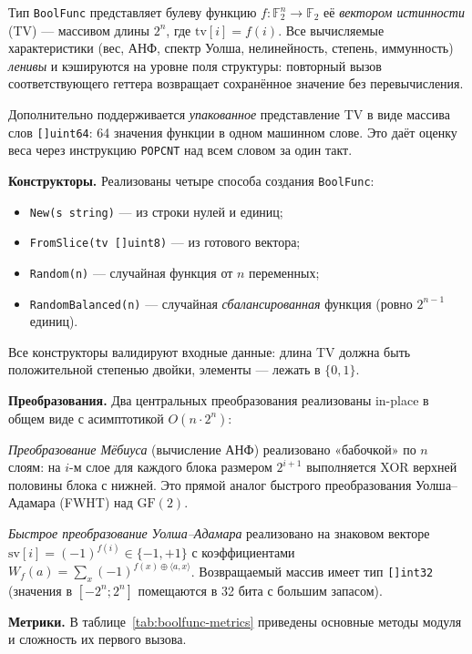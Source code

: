 Тип \texttt{BoolFunc} представляет булеву функцию $f: \mathbb{F}_2^n \to \mathbb{F}_2$
её \emph{вектором истинности} (TV) — массивом длины $2^n$, где
$\mathrm{tv}[i] = f(i)$. Все вычисляемые характеристики
(вес, АНФ, спектр Уолша, нелинейность, степень, иммунность)
\emph{ленивы} и кэшируются на уровне поля структуры: повторный
вызов соответствующего геттера возвращает сохранённое значение
без перевычисления.

Дополнительно поддерживается \emph{упакованное} представление
TV в виде массива слов \texttt{[]uint64}: 64 значения функции в
одном машинном слове. Это даёт оценку веса через инструкцию
\texttt{POPCNT} над всем словом за один такт.

\textbf{Конструкторы.} Реализованы четыре способа создания
\texttt{BoolFunc}:
\begin{itemize}
    \item \texttt{New(s string)} — из строки нулей и единиц;
    \item \texttt{FromSlice(tv []uint8)} — из готового вектора;
    \item \texttt{Random(n)} — случайная функция от $n$ переменных;
    \item \texttt{RandomBalanced(n)} — случайная \emph{сбалансированная}
        функция (ровно $2^{n-1}$ единиц).
\end{itemize}
Все конструкторы валидируют входные данные: длина TV должна быть
положительной степенью двойки, элементы — лежать в $\{0, 1\}$.

\textbf{Преобразования.} Два центральных преобразования реализованы
in-place в общем виде с асимптотикой $O(n \cdot 2^n)$:

\emph{Преобразование Мёбиуса} (вычисление АНФ) реализовано
«бабочкой» по $n$ слоям: на $i$-м слое для каждого блока размером
$2^{i+1}$ выполняется XOR верхней половины блока с нижней. Это
прямой аналог быстрого преобразования Уолша–Адамара (FWHT) над
$\mathrm{GF}(2)$.

\emph{Быстрое преобразование Уолша–Адамара} реализовано на знаковом
векторе $\mathrm{sv}[i] = (-1)^{f(i)} \in \{-1, +1\}$ с
коэффициентами $W_f(a) = \sum_x (-1)^{f(x) \oplus \langle a, x \rangle}$.
Возвращаемый массив имеет тип \texttt{[]int32} (значения в $[-2^n; 2^n]$
помещаются в 32 бита с большим запасом).

\textbf{Метрики.} В таблице~\ref{tab:boolfunc-metrics} приведены
основные методы модуля и сложность их первого вызова.


